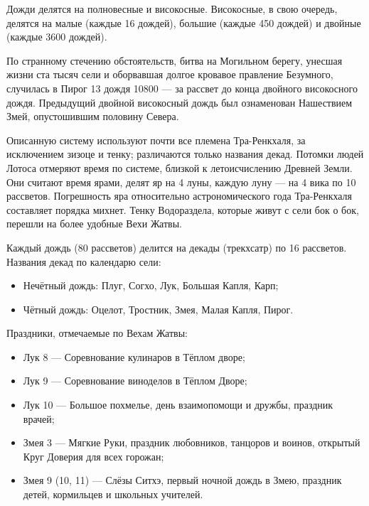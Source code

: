 Дожди делятся на полновесные и високосные.
Високосные, в свою очередь, делятся на малые (каждые 16 дождей), большие (каждые 450 дождей) и двойные (каждые 3600 дождей).

По странному стечению обстоятельств, битва на Могильном берегу, унесшая жизни ста тысяч сели и оборвавшая долгое кровавое правление Безумного, случилась в Пирог 13 дождя 10800 --- за рассвет до конца двойного високосного дождя.
Предыдущий двойной високосный дождь был ознаменован Нашествием Змей, опустошившим половину Севера.

Описанную систему используют почти все племена Тра-Ренкхаля, за исключением зизоце и тенку;
различаются только названия декад.
Потомки людей Лотоса отмеряют время по системе, близкой к летоисчислению Древней Земли.
Они считают время ярами, делят яр на 4 луны, каждую луну --- на 4 вика по 10 рассветов.
Погрешность яра относительно астрономического года Тра-Ренкхаля составляет порядка михнет.
Тенку Водораздела, которые живут с сели бок о бок, перешли на более удобные Вехи Жатвы.

Каждый дождь (80 рассветов) делится на декады (трекхсатр) по 16 рассветов.
Названия декад по календарю сели:

\begin{itemize}
\item Нечётный дождь: Плуг, Согхо, Лук, Большая Капля, Карп;
\item Чётный дождь: Оцелот, Тростник, Змея, Малая Капля, Пирог.
\end{itemize}

Праздники, отмечаемые по Вехам Жатвы:

\begin{itemize}
\item Лук 8 --- Соревнование кулинаров в Тёплом дворе;
\item Лук 9 --- Соревнование виноделов в Тёплом Дворе;
\item Лук 10 --- Большое похмелье, день взаимопомощи и дружбы, праздник врачей;
\item Змея 3 --- Мягкие Руки, праздник любовников, танцоров и воинов, открытый Круг Доверия для всех горожан;
\item Змея 9 (10, 11) --- Слёзы Ситхэ, первый ночной дождь в Змею, праздник детей, кормильцев и школьных учителей.
\end{itemize}


